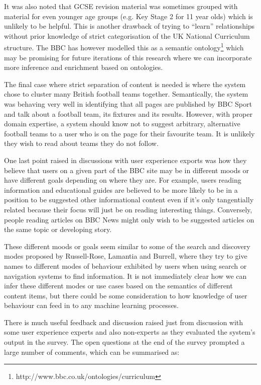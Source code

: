 It was also noted
that GCSE revision material was sometimes grouped with material for
even younger age groups (e.g. Key Stage 2 for 11 year olds) which
is unlikely to be helpful. This is another drawback of trying to
``learn'' relationships without prior knowledge of strict categorisation
of the UK National Curriculum structure. The BBC has however modelled
this as a semantic ontology\footnote{http://www.bbc.co.uk/ontologies/curriculum}
which may be promising for future iterations of this research where
we can incorporate more inference and enrichment based on
ontologies.

The final case where strict separation of content is needed is where
the system chose to cluster many British football teams together.
Semantically, the system was behaving very well in identifying that
all pages are published by BBC Sport and talk about a football team,
its fixtures and its results. However, with proper domain expertise,
a system should know not to suggest arbitrary, alternative football
teams to a user who is on the page for their favourite team. It is
unlikely they wish to read about teams they do not follow.

One last point raised in discussions with user experience exports was
how they believe that users on a given part of the BBC site may be
in different moods or have different goals depending on where they
are. For example, users reading information and educational guides
are believed to be more likely to be in a position to be suggested
other informational content even if it's only tangentially related
because their focus will just be on reading interesting things.
Conversely, people reading articles on BBC News might only wish to
be suggested articles on the same topic or developing story.

These different moods or goals seem similar to some of the search
and discovery modes proposed by Russell-Rose, Lamantia
and Burrell\cite{russell2011taxonomy}, where they try to give names
to different modes of behaviour exhibited by users when using search
or navigation systems to find information. It is not immediately clear
how we can infer these different modes or use cases based on
the semantics of different content items, but there could be some
consideration to how knowledge of user behaviour can feed in to
any machine learning processes.

There is much useful feedback and discussion raised just from
discussion with some user experience experts and also non-experts as
they evaluated the system's output in the survey. The open questions
at the end of the survey prompted a large number of comments, which
can be summarised as:

